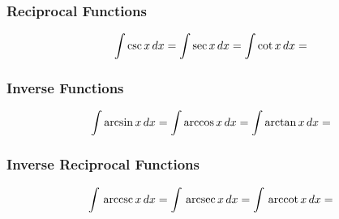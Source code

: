 \documentclass[12pt]{article}
\numberwithin{equation}{subsubsection}
\begin{document}
			\subsubsection{Reciprocal Functions}
				\begin{gather}
					\int \csc x\,d x =
					\int \sec x\,d x =
					\int \cot x\,d x =
				\end{gather}
			\subsubsection{Inverse Functions}
				\begin{gather}
					\int \arcsin x\,d x =
					\int \arccos x\,d x =
					\int \arctan x\,d x =
				\end{gather}
			\subsubsection{Inverse Reciprocal Functions}
				\begin{gather}
					\int \,\text{arccsc}\, x\,d x =
					\int \,\text{arcsec}\, x\,d x =
					\int \,\text{arccot}\, x\,d x =
				\end{gather}
\end{document}
